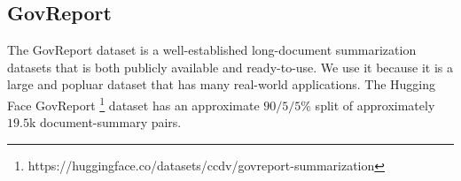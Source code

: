 \subsection*{GovReport}
The GovReport dataset is a well-established long-document summarization datasets that is both publicly available and ready-to-use. We use it because it is a large and popluar
dataset that has many real-world applications. The Hugging Face GovReport \footnote{https://huggingface.co/datasets/ccdv/govreport-summarization} dataset has an 
approximate $90/5/5\%$ split of approximately $19.5$k document-summary pairs. 